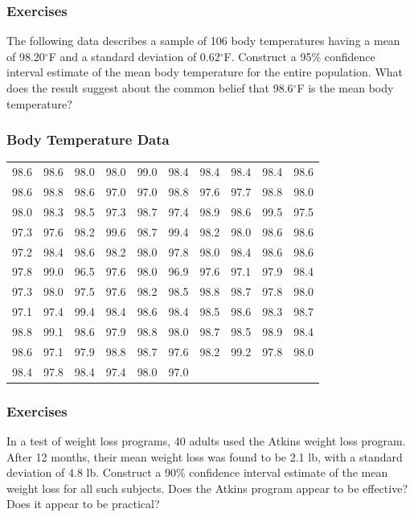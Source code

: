 \documentclass[xcolor=dvipsnames]{beamer}
\begin{document}
\begin{frame}
  \frametitle{Exercises}
  {\ubung} The following data describes a sample of 106 body
  temperatures having a mean of 98.20$^{\circ}$F and a standard
  deviation of 0.62$^{\circ}$F. Construct a 95\% confidence interval
  estimate of the mean body temperature for the entire population.
  What does the result suggest about the common belief that
  98.6$^{\circ}$F is the mean body temperature?
\end{frame}

\begin{frame}
  \frametitle{Body Temperature Data}
  \begin{tabular}{|rrrrrrrrrr|}\hline
    98.6 & 98.6 & 98.0 & 98.0 & 99.0 & 98.4 & 98.4 & 98.4 & 98.4 & 98.6 \\
    98.6 & 98.8 & 98.6 & 97.0 & 97.0 & 98.8 & 97.6 & 97.7 & 98.8 & 98.0 \\
    98.0 & 98.3 & 98.5 & 97.3 & 98.7 & 97.4 & 98.9 & 98.6 & 99.5 & 97.5 \\
    97.3 & 97.6 & 98.2 & 99.6 & 98.7 & 99.4 & 98.2 & 98.0 & 98.6 & 98.6 \\
    97.2 & 98.4 & 98.6 & 98.2 & 98.0 & 97.8 & 98.0 & 98.4 & 98.6 & 98.6 \\
    97.8 & 99.0 & 96.5 & 97.6 & 98.0 & 96.9 & 97.6 & 97.1 & 97.9 & 98.4 \\
    97.3 & 98.0 & 97.5 & 97.6 & 98.2 & 98.5 & 98.8 & 98.7 & 97.8 & 98.0 \\
    97.1 & 97.4 & 99.4 & 98.4 & 98.6 & 98.4 & 98.5 & 98.6 & 98.3 & 98.7 \\
    98.8 & 99.1 & 98.6 & 97.9 & 98.8 & 98.0 & 98.7 & 98.5 & 98.9 & 98.4 \\
    98.6 & 97.1 & 97.9 & 98.8 & 98.7 & 97.6 & 98.2 & 99.2 & 97.8 & 98.0 \\
    98.4 & 97.8 & 98.4 & 97.4 & 98.0 & 97.0 & &&& \\ \hline
  \end{tabular}
\end{frame}

\begin{frame}
  \frametitle{Exercises}
  {\ubung} In a test of weight loss programs, 40 adults used the
  Atkins weight loss program. After 12 months, their mean weight
  loss was found to be 2.1 lb, with a standard deviation of 4.8
  lb. Construct a 90\% confidence interval estimate of the mean
  weight loss for all such subjects. Does the Atkins program
  appear to be effective? Does it appear to be practical?
\end{frame}
\end{document}
